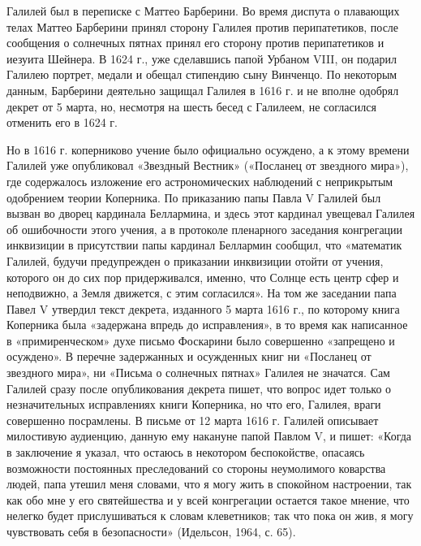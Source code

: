 Галилей был в переписке с Маттео Барберини. Во время диспута о плавающих телах
Маттео Барберини принял сторону Галилея против перипатетиков, после сообщения о
солнечных пятнах принял его сторону против перипатетиков и иезуита Шейнера. В
1624 г., уже сделавшись папой Урбаном VIII, он подарил Галилею портрет, медали
и обещал стипендию сыну Винченцо. По некоторым данным, Барберини деятельно
защищал Галилея в 1616 г. и не вполне одобрял декрет от 5 марта, но, несмотря
на шесть бесед с Галилеем, не согласился отменить его в 1624 г.

Но в 1616 г. коперниково учение было официально осуждено, а к этому времени
Галилей уже опубликовал «Звездный Вестник» («Посланец от звездного мира»), где
содержалось изложение его астрономических наблюдений с неприкрытым одобрением
теории Коперника.
По приказанию папы Павла V Галилей был вызван во дворец кардинала Беллармина, и
здесь этот кардинал увещевал Галилея об ошибочности этого учения, а в протоколе
пленарного заседания конгрегации инквизиции в присутствии папы кардинал
Беллармин сообщил, что «математик Галилей, будучи предупрежден о приказании
инквизиции отойти от учения, которого он до сих пор придерживался, именно, что
Солнце есть центр сфер и неподвижно, а Земля движется, с этим согласился». На
том же заседании папа Павел V утвердил текст декрета, изданного 5 марта 1616
г., по которому книга Коперника была «задержана впредь до исправления», в то
время как написанное в «примиренческом» духе письмо Фоскарини было совершенно
«запрещено и осуждено». В перечне задержанных и осужденных книг ни «Посланец от
звездного мира», ни «Письма о солнечных пятнах» Галилея не значатся. Сам
Галилей сразу после опубликования декрета пишет, что вопрос идет только о
незначительных исправлениях книги Коперника, но что его, Галилея, враги
совершенно посрамлены. В письме от 12 марта 1616 г. Галилей описывает
милостивую аудиенцию, данную ему накануне папой Павлом V, и пишет: «Когда в
заключение я указал, что остаюсь в некотором беспокойстве, опасаясь возможности
постоянных преследований со стороны неумолимого коварства людей, папа утешил
меня словами, что я могу жить в спокойном настроении, так как обо мне у его
святейшества и у всей конгрегации остается такое мнение, что нелегко будет
прислушиваться к словам клеветников; так что пока он жив, я могу чувствовать
себя в безопасности» (Идельсон, 1964, с. 65).

